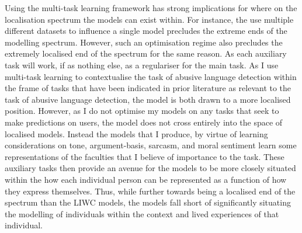 Using the multi-task learning framework has strong implications for where on the localisation spectrum the models can exist within. For instance, the use multiple different datasets to influence a single model precludes the extreme ends of the modelling spectrum. However, such an optimisation regime also precludes the extremely localised end of the spectrum for the same reason. As each auxiliary task will work, if as nothing else, as a regulariser for the main task. As I use multi-task learning to contextualise the task of abusive language detection within the frame of tasks that have been indicated in prior literature as relevant to the task of abusive language detection, the model is both drawn to a more localised position.
However, as I do not optimise my models on any tasks that seek to make predictions on users, the model does not cross entirely into the space of localised models. Instead the models that I produce, by virtue of learning considerations on tone, argument-basis, sarcasm, and moral sentiment learn some representations of the faculties that I believe of importance to the task. These auxiliary tasks then provide an avenue for the models to be more closely situated within the how each individual person can be represented as a function of how they express themselves. Thus, while further towards being a localised end of the spectrum than the LIWC models, the models fall short of significantly situating the modelling of individuals within the context and lived experiences of that individual.


